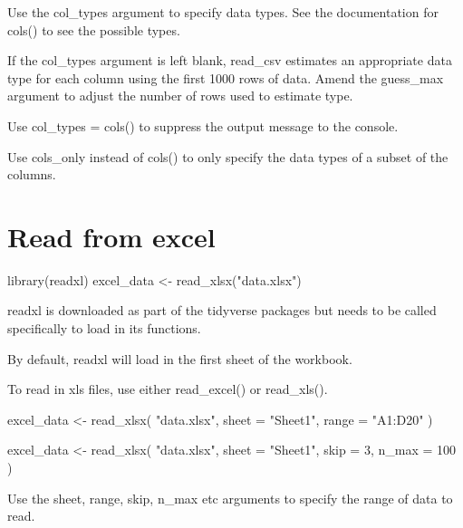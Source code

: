 \documentclass[
]{book}
\newenvironment{Shaded}{\begin{snugshade}}{\end{snugshade}}
\newcommand{\AttributeTok}[1]{\textcolor[rgb]{0.77,0.63,0.00}{#1}}
\newcommand{\DecValTok}[1]{\textcolor[rgb]{0.00,0.00,0.81}{#1}}
\newcommand{\FunctionTok}[1]{\textcolor[rgb]{0.00,0.00,0.00}{#1}}
\newcommand{\NormalTok}[1]{#1}
\newcommand{\OtherTok}[1]{\textcolor[rgb]{0.56,0.35,0.01}{#1}}
\newcommand{\StringTok}[1]{\textcolor[rgb]{0.31,0.60,0.02}{#1}}
\begin{document}
Use the col\_types argument to specify data types. See the documentation for cols() to see the possible types.

If the col\_types argument is left blank, read\_csv estimates an appropriate data type for each column using the first 1000 rows of data. Amend the guess\_max argument to adjust the number of rows used to estimate type.

Use col\_types = cols() to suppress the output message to the console.

Use cols\_only instead of cols() to only specify the data types of a subset of the columns.

\hypertarget{read-from-excel}{%
\section{Read from excel}\label{read-from-excel}}

\begin{Shaded}
\begin{Highlighting}[]
\FunctionTok{library}\NormalTok{(readxl)}
\NormalTok{excel\_data }\OtherTok{\textless{}{-}} \FunctionTok{read\_xlsx}\NormalTok{(}\StringTok{"data.xlsx"}\NormalTok{)}
\end{Highlighting}
\end{Shaded}

readxl is downloaded as part of the tidyverse packages but needs to be called specifically to load in its functions.

By default, readxl will load in the first sheet of the workbook.

To read in xls files, use either read\_excel() or read\_xls().

\begin{Shaded}
\begin{Highlighting}[]
\NormalTok{excel\_data }\OtherTok{\textless{}{-}} \FunctionTok{read\_xlsx}\NormalTok{(}
  \StringTok{"data.xlsx"}\NormalTok{,}
  \AttributeTok{sheet =} \StringTok{"Sheet1"}\NormalTok{,}
  \AttributeTok{range =} \StringTok{"A1:D20"}
\NormalTok{)}

\NormalTok{excel\_data }\OtherTok{\textless{}{-}} \FunctionTok{read\_xlsx}\NormalTok{(}
  \StringTok{"data.xlsx"}\NormalTok{,}
  \AttributeTok{sheet =} \StringTok{"Sheet1"}\NormalTok{,}
  \AttributeTok{skip =} \DecValTok{3}\NormalTok{,}
  \AttributeTok{n\_max =} \DecValTok{100}
\NormalTok{)}
\end{Highlighting}
\end{Shaded}

Use the sheet, range, skip, n\_max etc arguments to specify the range of data to read.
\end{document}
